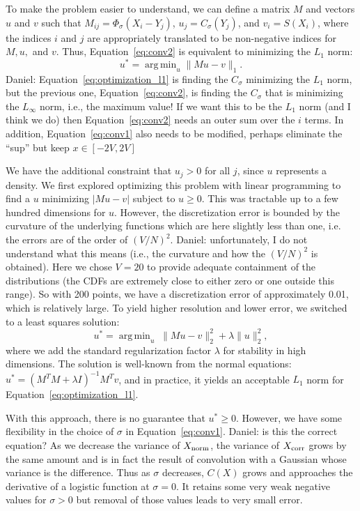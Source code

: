 \documentclass{article}
\DeclareMathOperator*{\argmin}{arg\,min}
\begin{document}
To make the problem easier to understand, we can define a matrix $M$ and vectors
$u$ and $v$ such that $M_{ij} = \Phi_{\sigma}(X_i-Y_j)$, $u_j =
C_{\sigma}(Y_j)$, and $v_i = S(X_i)$, where the indices $i$ and $j$ are
appropriately translated to be non-negative indices for $M, u,$ and $v$. Thus,
Equation~\ref{eq:conv2} is equivalent to minimizing the $L_1$ norm:
\begin{equation}\label{eq:optimization_l1}
    u^* = \argmin_{u} \|Mu-v\|_1.
\end{equation}
{\color{blue} Daniel: Equation~\ref{eq:optimization_l1} is finding
the $C_\sigma$ minimizing the $L_1$ norm, but the previous one,
Equation~\ref{eq:conv2}, is finding the $C_\sigma$ that is minimizing the
$L_\infty$ norm, i.e., the maximum value! If we want this to be the $L_1$ norm
(and I think we do) then Equation~\ref{eq:conv2} needs an outer sum over the $i$
terms. In addition, Equation~\ref{eq:conv1} also needs to be modified, perhaps
eliminate the ``sup'' but keep $x \in [-2V,2V]$}

We have the additional constraint that $u_j > 0$ for all $j$, since $u$
represents a density. We first explored optimizing this problem with linear
programming to find a $u$ minimizing $|Mu - v|$ subject to $u \ge 0$. This was
tractable up to a few hundred dimensions for $u$. However, the discretization
error is bounded by the curvature of the underlying functions which are here
slightly less than one, i.e.  the errors are of the order of $(V/N)^2$.
{\color{blue} Daniel: unfortunately, I do not understand what this means (i.e.,
the curvature and how the $(V/N)^2$ is obtained).} Here we chose $V=20$ to
provide adequate containment of the distributions (the CDFs are extremely close
to either zero or one outside this range). So with 200 points, we have a
discretization error of approximately 0.01, which is relatively large.  To yield
higher resolution and lower error, we switched to a least squares solution:
\begin{equation}\label{eq:optimization_l2}
    u^* = \argmin_u\; \|Mu-v\|_2^2 + \lambda \|u\|_2^2,
\end{equation}
where we add the standard regularization factor $\lambda$ for stability in high
dimensions. The solution is well-known from the normal equations: $u^* = (M^TM +
\lambda I)^{-1}M^Tv$, and in practice, it yields an acceptable $L_1$ norm for
Equation~\ref{eq:optimization_l1}.

With this approach, there is no guarantee that $u^* \geq 0$. However, we have
some flexibility in the choice of $\sigma$ in Equation~\ref{eq:conv1}.
{\color{blue} Daniel: is this the correct equation?} As we decrease the variance
of $X_{\rm norm}$, the variance of $X_{\rm corr}$ grows by the same amount and
is in fact the result of convolution with a Gaussian whose variance is the
difference.  Thus as $\sigma$ decreases, $C(X)$ grows and approaches the
derivative of a logistic function at $\sigma = 0$. It retains some very weak
negative values for $\sigma > 0$ but removal of those values leads to very small
error.
\end{document}
